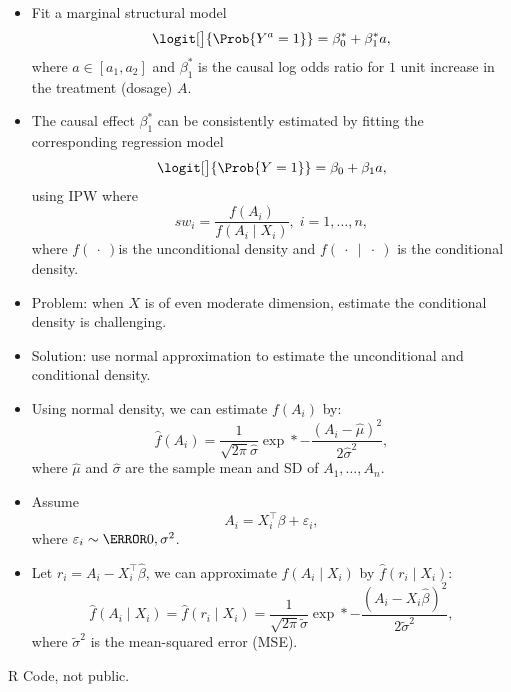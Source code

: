 \begin{itemize}
      \item Fit a marginal structural model
            \[ \logit[\big]{\Prob{Y^a=1}}=\beta_0^*+\beta_1^*a, \]
            where $ a\in[a_1,a_2] $ and $ \beta_1^* $ is the causal log odds ratio for $1$
            unit increase in the treatment (dosage) $A$.
      \item The causal effect $ \beta_1^* $ can be consistently estimated by fitting
            the corresponding regression model
            \[ \logit[\big]{\Prob{Y=1}}=\beta_0+\beta_1a, \]
            using IPW where
            \[ sw_i=\frac{f(A_i)}{f(A_i\mid X_i)},\; i=1,\ldots,n, \]
            where $f(\:\cdot\:)$is the unconditional density and  $f(\:\cdot\:\mid\:\cdot\:)$ is the
            conditional density.
      \item Problem: when $X$ is of even moderate dimension, estimate the
            conditional density is challenging.
      \item Solution: use normal approximation to estimate the
            unconditional and conditional density.
      \item Using normal density, we can estimate $f (A_i )$ by:
            \[ \hat{f}(A_i)=\frac{1}{\sqrt{2\pi}\hat{\sigma}}\exp*{-\frac{(A_i-\hat{\mu})^2}{2\hat{\sigma}^2}}, \]
            where $ \hat{\mu} $ and $ \hat{\sigma} $ are the sample mean and SD of $ A_1,\ldots,A_n $.
      \item Assume
            \[ A_i=X_i^\top \beta+\varepsilon_i, \]
            where $ \varepsilon_i \sim \N{0,\sigma^2} $.
      \item Let $ r_i=A_i-X_i^\top \hat{\beta} $, we can approximate $ f(A_i\mid X_i) $ by $ \hat{f}(r_i\mid X_i) $:
            \[ \hat{f}(A_i\mid X_i)=\hat{f}(r_i\mid X_i)=\frac{1}{\sqrt{2\pi}\tilde{\sigma}}\exp*{-\frac{(A_i-X_i\hat{\beta})^2}{2\tilde{\sigma}^2}}, \]
            where $ \tilde{\sigma}^2 $ is the mean-squared error (MSE).
\end{itemize}
R Code, not public.